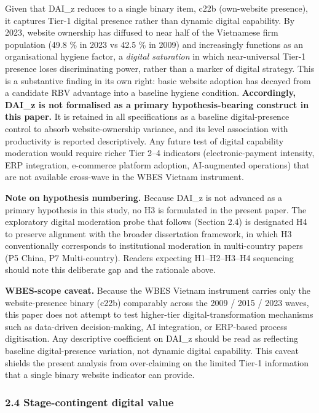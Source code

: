 \documentclass[12pt,a4paper]{article}
\begin{document}
Given that DAI\_z reduces to a single binary item, c22b (own-website
presence), it captures Tier-1 digital presence rather than dynamic
digital capability. By 2023, website ownership has diffused to near half
of the Vietnamese firm population (49.8 \% in 2023 vs 42.5 \% in 2009)
and increasingly functions as an organisational hygiene factor, a
\emph{digital saturation} in which near-universal Tier-1 presence loses
discriminating power, rather than a marker of digital strategy. This is
a substantive finding in its own right: basic website adoption has
decayed from a candidate RBV advantage into a baseline hygiene
condition. \textbf{Accordingly, DAI\_z is not formalised as a primary
hypothesis-bearing construct in this paper.} It is retained in all
specifications as a baseline digital-presence control to absorb
website-ownership variance, and its level association with productivity
is reported descriptively. Any future test of digital capability
moderation would require richer Tier 2--4 indicators (electronic-payment
intensity, ERP integration, e-commerce platform adoption, AI-augmented
operations) that are not available cross-wave in the WBES Vietnam
instrument.

\textbf{Note on hypothesis numbering.} Because DAI\_z is not advanced as
a primary hypothesis in this study, no H3 is formulated in the present
paper. The exploratory digital moderation probe that follows (Section
2.4) is designated H4 to preserve alignment with the broader
dissertation framework, in which H3 conventionally corresponds to
institutional moderation in multi-country papers (P5 China, P7
Multi-country). Readers expecting H1--H2--H3--H4 sequencing should note
this deliberate gap and the rationale above.

\textbf{WBES-scope caveat.} Because the WBES Vietnam instrument carries
only the website-presence binary (c22b) comparably across the 2009 /
2015 / 2023 waves, this paper does not attempt to test higher-tier
digital-transformation mechanisms such as data-driven decision-making,
AI integration, or ERP-based process digitisation. Any descriptive
coefficient on DAI\_z should be read as reflecting baseline
digital-presence variation, not dynamic digital capability. This caveat
shields the present analysis from over-claiming on the limited Tier-1
information that a single binary website indicator can provide.

\hypertarget{24-stage-contingent-digital-value}{%
\subsubsection{2.4 Stage-contingent digital
value}\label{24-stage-contingent-digital-value}}
\end{document}
